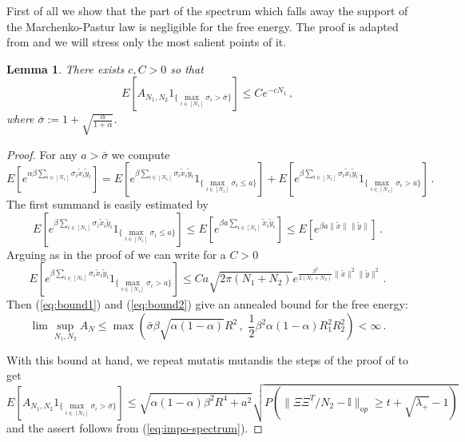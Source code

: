\documentclass[10pt,oneside,a4paper,reqno]{amsart}  %
\def\be{\begin{equation}}
\def\ee{\end{equation}}
\def\a{\alpha}
\def\b{\beta}
\def\l{\lambda}
\def\s{\sigma}
\theoremstyle{plain}
\newtheorem{lemma}[theorem]{Lemma}
\numberwithin{equation}{section}
\begin{document}
First of all we show that the part of the spectrum which falls away the support of the Marchenko-Pastur law is negligible for the free energy. The proof is adapted from \cite{legendre} and we will stress only the most salient points of it. 
\begin{lemma}
There exists $c,C>0$ so that $$E[A_{N_1,N_2}1_{\{\max_{i\in[N_1]}\s_i>\bar\s\}}]\leq Ce^{-cN_1}\,,$$ where
$\bar \s:= 1+\sqrt{\frac{\a}{1+\a}}$. 
\end{lemma}
\begin{proof}
For any $a>\bar\s$ we compute
$$
E[e^{\a\b\sum_{i\in[N_1]}\s_i\tilde x_i\tilde y_i}]=E[e^{\b\sum_{i\in[N_1]}\s_i\tilde x_i\tilde y_i}1_{\{\max_{i\in[N_1]}\s_i\leq a\}}]+E[e^{\b\sum_{i\in[N_1]}\s_i\tilde x_i\tilde y_i}1_{\{\max_{i\in[N_1]}\s_i>a\}}]\,.
$$
The first summand is easily estimated by
\be\label{eq:bound1}
E[e^{\b\sum_{i\in[N_1]}\s_i\tilde x_i\tilde y_i}1_{\{\max_{i\in[N_1]}\s_i\leq a\}}]\leq E[e^{\b a\sum_{i\in[N_1]}\tilde x_i\tilde y_i}]\leq E[e^{\b a \|\tilde x\|\|\tilde y\|}]\,. 
\ee
Arguing as in the proof of \cite[Proposition 1]{legendre} we can write for a $C>0$
\be\label{eq:bound2}
E[e^{\b\sum_{i\in[N_1]}\s_i\tilde x_i\tilde y_i}1_{\{\max_{i\in[N_1]}\s_i>a\}}]\leq Ca\sqrt{2\pi (N_1+N_2)}e^{\frac{\b^2}{2(N_1+N_2)}\|\tilde x\|^2\|\tilde y\|^2}\,.
\ee
Then (\ref{eq:bound1}) and (\ref{eq:bound2}) give an annealed bound for the free energy:
\be
\lim\sup_{N_1,N_2} A_N\leq \max\left(\bar\s\b\sqrt{\a(1-\a)}R^2\,,\,\,\frac12 \b^2\a(1-\a)R^2_1R^2_2 \right)<\infty\,. 
\ee

With this bound at hand, we repeat mutatis mutandis the steps of the proof of \cite[Lemma 1]{legendre} to get
\be
E[A_{N_1,N_2}1_{\{\max_{i\in[N_1]}\s_i>\bar\s\}}]\leq\sqrt{\a(1-\a)\b^2R^4+a^2}\sqrt{P(\|\Xi\Xi^T/N_2-\mathbb I\|_{op}\geq t+\sqrt{\l_+}-1)}
\ee
and the assert follows from (\ref{eq:impo-spectrum}). 
\end{proof}
\end{document}
